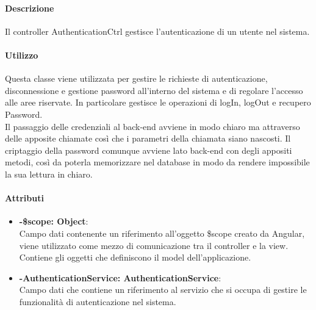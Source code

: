 \paragraph{Descrizione}
Il controller AuthenticationCtrl gestisce l'autenticazione di un utente nel sistema.

\paragraph{Utilizzo}
Questa classe viene utilizzata per gestire le richieste di autenticazione, disconnessione e gestione password all'interno del sistema e di regolare l'accesso alle aree riservate.
In particolare gestisce le operazioni di logIn, logOut e recupero Password.\\
Il passaggio delle credenziali al back-end avviene in modo chiaro ma attraverso delle apposite chiamate così che i parametri della chiamata siano nascosti. Il criptaggio della password comunque avviene lato back-end con degli appositi metodi, così da poterla memorizzare nel database in modo da rendere impossibile la sua lettura in chiaro.
\paragraph{Attributi}
\begin{itemize}
	\item \textbf{-\$scope: Object}:\\
	Campo dati contenente un riferimento all'oggetto \$scope creato da Angular, viene utilizzato come mezzo di comunicazione tra il controller e la view. Contiene gli oggetti che definiscono il model dell'applicazione.
	\item \textbf{-AuthenticationService: AuthenticationService}:\\
	Campo dati che contiene un riferimento al servizio che si occupa di gestire le funzionalità di autenticazione nel sistema.
\end{itemize}

